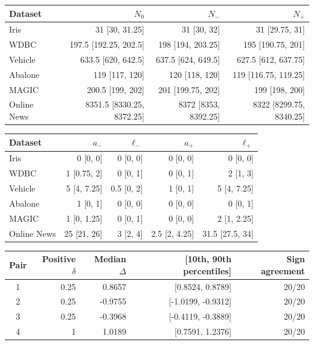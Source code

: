 \begin{table}
\label{tab:split-counts}
\begin{tabular}{lrrr}
\toprule
Dataset & $N_0$ & $N_-$ & $N_+$ \\
\midrule
Iris & 31 [30, 31.25] & 31 [30, 32] & 31 [29.75, 31] \\
WDBC & 197.5 [192.25, 202.5] & 198 [194, 203.25] & 195 [190.75, 201] \\
Vehicle & 633.5 [620, 642.5] & 637.5 [624, 649.5] & 627.5 [612, 637.75] \\
Abalone & 119 [117, 120] & 120 [118, 120] & 119 [116.75, 119.25] \\
MAGIC & 200.5 [199, 202] & 201 [199.75, 202] & 199 [198, 200] \\
Online News & 8351.5 [8330.25, 8372.25] & 8372 [8353, 8392.25] & 8322 [8299.75, 8340.25] \\
\bottomrule
\end{tabular}
\begin{tabular}{lrrrr}
\toprule
Dataset & $a_-$ & $\ell_-$ & $a_+$ & $\ell_+$ \\
\midrule
Iris & 0 [0, 0] & 0 [0, 0] & 0 [0, 0] & 0 [0, 0] \\
WDBC & 1 [0.75, 2] & 0 [0, 1] & 0 [0, 1] & 2 [1, 3] \\
Vehicle & 5 [4, 7.25] & 0.5 [0, 2] & 1 [0, 1] & 5 [4, 7.25] \\
Abalone & 1 [0, 1] & 0 [0, 0] & 0 [0, 0] & 0 [0, 1] \\
MAGIC & 1 [0, 1.25] & 0 [0, 1] & 0 [0, 0] & 2 [1, 2.25] \\
Online News & 25 [21, 26] & 3 [2, 4] & 2.5 [2, 4.25] & 31.5 [27.5, 34] \\
\bottomrule
\end{tabular}
\end{table}

\begin{table}
\label{tab:split-gaps}
\begin{tabular}{crrrr}
\toprule
Pair & Positive $\delta$ & Median $\Delta$ & [10th, 90th percentiles] & Sign agreement \\
\midrule
1 & 0.25 & 0.8657 & [0.8524, 0.8789] & 20/20 \\
2 & 0.25 & -0.9755 & [-1.0199, -0.9312] & 20/20 \\
3 & 0.25 & -0.3968 & [-0.4119, -0.3889] & 20/20 \\
4 & 1 & 1.0189 & [0.7591, 1.2376] & 20/20 \\
\bottomrule
\end{tabular}
\end{table}

